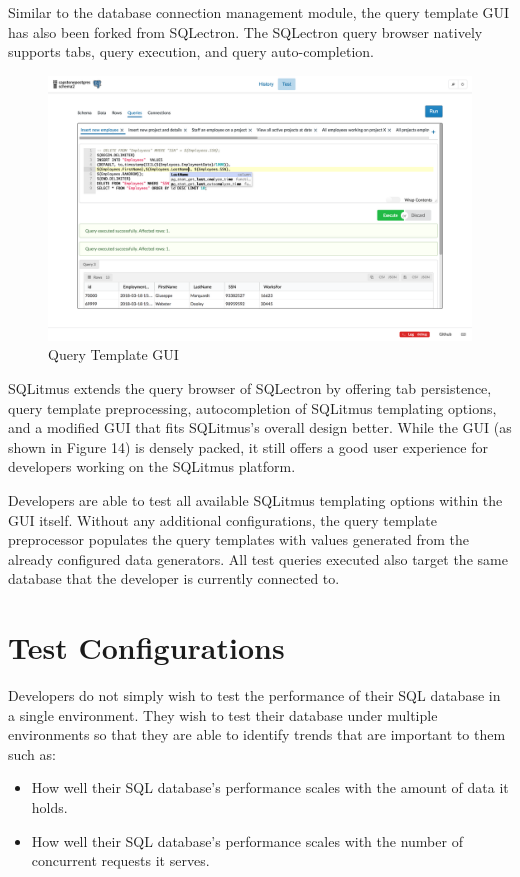 \documentclass[12pt]{report}
\begin{document}
\begin{spacing}{1.9}
	Similar to the database connection management module, the query template GUI has also been forked from SQLectron. The SQLectron query browser natively supports tabs, query execution, and query auto-completion.
	
	\begin{figure}[H]
		\centering
		\includegraphics[width=\textwidth]{3-3-2.png}
		\caption{Query Template GUI}
		
	\end{figure}
	
	SQLitmus extends the query browser of SQLectron by offering tab persistence, query template preprocessing, autocompletion of SQLitmus templating options, and a modified GUI that fits SQLitmus's overall design better. While the GUI (as shown in Figure 14) is densely packed, it still offers a good user experience for developers working on the SQLitmus platform.
	
	Developers are able to test all available SQLitmus templating options within the GUI itself. Without any additional configurations, the query template preprocessor populates the query templates with values generated from the already configured data generators. All test queries executed also target the same database that the developer is currently connected to.
	
	
	\section{Test Configurations}
	
	Developers do not simply wish to test the performance of their SQL database in a single environment. They wish to test their database under multiple environments so that they are able to identify trends that are important to them such as:
	\begin{itemize}
		\item How well their SQL database's performance scales with the amount of data it holds.
		\item How well their SQL database's performance scales with the number of concurrent requests it serves.
	\end{itemize}
	

\end{spacing}
\end{document}
